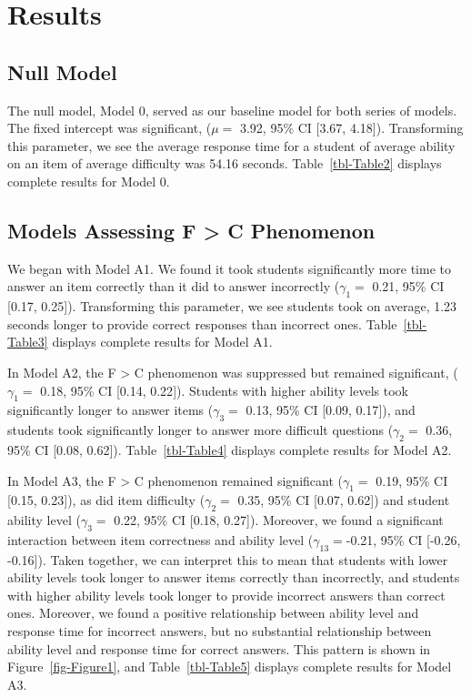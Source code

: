 \documentclass[
  number]{elsarticle}
\begin{document}
\section{Results}\label{results}

\subsection{Null Model}\label{null-model}

The null model, Model 0, served as our baseline model for both series of
models. The fixed intercept was significant, (\(μ=\) 3.92, 95\% CI
{[}3.67, 4.18{]}). Transforming this parameter, we see the average
response time for a student of average ability on an item of average
difficulty was 54.16 seconds. Table~\ref{tbl-Table2} displays complete
results for Model 0.

\subsection{Models Assessing F \textgreater{} C
Phenomenon}\label{models-assessing-f-c-phenomenon}

We began with Model A1. We found it took students significantly more
time to answer an item correctly than it did to answer incorrectly
(\(γ_1=\) 0.21, 95\% CI {[}0.17, 0.25{]}). Transforming this parameter,
we see students took on average, 1.23 seconds longer to provide correct
responses than incorrect ones. Table~\ref{tbl-Table3} displays complete
results for Model A1.

In Model A2, the F \textgreater{} C phenomenon was suppressed but
remained significant, (\(γ_1=\) 0.18, 95\% CI {[}0.14, 0.22{]}).
Students with higher ability levels took significantly longer to answer
items (\(γ_3=\) 0.13, 95\% CI {[}0.09, 0.17{]}), and students took
significantly longer to answer more difficult questions (\(γ_2=\) 0.36,
95\% CI {[}0.08, 0.62{]}). Table~\ref{tbl-Table4} displays complete
results for Model A2.

In Model A3, the F \textgreater{} C phenomenon remained significant
(\(γ_1=\) 0.19, 95\% CI {[}0.15, 0.23{]}), as did item difficulty
(\(γ_2=\) 0.35, 95\% CI {[}0.07, 0.62{]}) and student ability level
(\(γ_3=\) 0.22, 95\% CI {[}0.18, 0.27{]}). Moreover, we found a
significant interaction between item correctness and ability level
(\(γ_{13}=\)-0.21, 95\% CI {[}-0.26, -0.16{]}). Taken together, we can
interpret this to mean that students with lower ability levels took
longer to answer items correctly than incorrectly, and students with
higher ability levels took longer to provide incorrect answers than
correct ones. Moreover, we found a positive relationship between ability
level and response time for incorrect answers, but no substantial
relationship between ability level and response time for correct
answers. This pattern is shown in Figure~\ref{fig-Figure1}, and
Table~\ref{tbl-Table5} displays complete results for Model A3.
\end{document}
